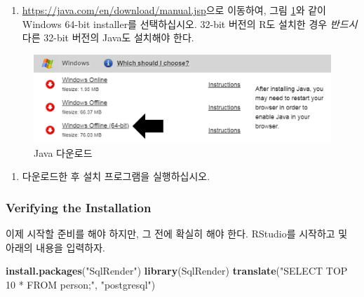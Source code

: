 \documentclass[11pt]{book}
\newenvironment{Shaded}{\begin{snugshade}}{\end{snugshade}}
\newcommand{\KeywordTok}[1]{\textcolor[rgb]{0.13,0.29,0.53}{\textbf{#1}}}
\newcommand{\StringTok}[1]{\textcolor[rgb]{0.31,0.60,0.02}{#1}}
\newcommand{\NormalTok}[1]{#1}
\providecommand{\tightlist}{%
  \setlength{\itemsep}{0pt}\setlength{\parskip}{0pt}}
\theoremstyle{definition}
\theoremstyle{definition}
\theoremstyle{definition}
\theoremstyle{remark}
\begin{document}
\begin{enumerate}
\def\labelenumi{\arabic{enumi}.}
\tightlist
\item
  \url{https://java.com/en/download/manual.jsp}으로 이동하여, 그림
  \ref{fig:downloadJava}와 같이 Windows 64-bit installer를 선택하십시오.
  32-bit 버전의 R도 설치한 경우 \emph{반드시} 다른 32-bit 버전의 Java도
  설치해야 한다.
\end{enumerate}

\begin{figure}

{\centering \includegraphics[width=1\linewidth]{images/OhdsiAnalyticsTools/downloadJava} 

}

\caption{Java 다운로드}\label{fig:downloadJava}
\end{figure}

\begin{enumerate}
\def\labelenumi{\arabic{enumi}.}
\setcounter{enumi}{1}
\tightlist
\item
  다운로드한 후 설치 프로그램을 실행하십시오.
\end{enumerate}

\subsubsection*{Verifying the
Installation}\label{verifying-the-installation}

이제 시작할 준비를 해야 하지만, 그 전에 확실히 해야 한다. RStudio를
시작하고 및 아래의 내용을 입력하자.

\begin{Shaded}
\begin{Highlighting}[]
\KeywordTok{install.packages}\NormalTok{(}\StringTok{"SqlRender"}\NormalTok{)}
\KeywordTok{library}\NormalTok{(SqlRender)}
\KeywordTok{translate}\NormalTok{(}\StringTok{"SELECT TOP 10 * FROM person;"}\NormalTok{, }\StringTok{"postgresql"}\NormalTok{)}
\end{Highlighting}
\end{Shaded}
\end{document}
